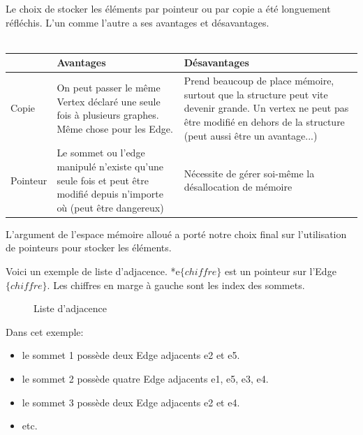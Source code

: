 \documentclass[french]{article}
\begin{document}
			Le choix de stocker les éléments par pointeur ou par copie a été longuement réfléchis. L'un comme l'autre a ses avantages et désavantages.\\ \\
			\begin{tabular}{p{}|p{0.4\textwidth}|p{}}
				 &Avantages&Désavantages\\
				\hline
				Copie& On peut passer le même Vertex déclaré une seule fois à plusieurs graphes. Même chose pour les Edge. & Prend beaucoup de place mémoire, surtout que la structure peut vite devenir grande. Un vertex ne peut pas être modifié en dehors de la structure (peut aussi être un avantage...)\\
				\hline
				Pointeur& Le sommet ou l'edge manipulé n'existe qu'une seule fois et peut être modifié depuis n'importe où (peut être dangereux) & Nécessite de gérer soi-même la désallocation de mémoire \\
			\end{tabular}
			
			L'argument de l'espace mémoire alloué a porté notre choix final sur l'utilisation de pointeurs pour stocker les éléments.			
		
			Voici un exemple de liste d'adjacence. *e$\{chiffre\}$ est un pointeur sur l'Edge $\{chiffre\}$. Les chiffres en marge à gauche sont les index des sommets.
			\begin{figure}[H]
				\centering
				\caption{Liste d'adjacence}
			\end{figure}
			Dans cet exemple:
			\begin{itemize}
				\item le sommet 1 possède deux Edge adjacents e2 et e5.
				\item le sommet 2 possède quatre Edge adjacents e1, e5, e3, e4.
				\item le sommet 3 possède deux Edge adjacents e2 et e4.
				\item etc.
			\end{itemize}
			
\end{document}
